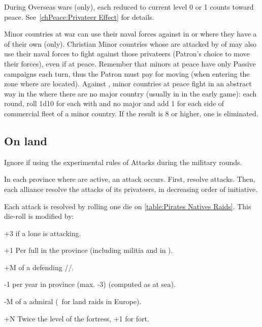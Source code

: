 \bparag During Overseas wars (only), each \TradeFLEET\Faceplus reduced to
current level 0 or 1 counts toward peace.
\bparag See~\ref{chPeace:Privateer Effect} for details.

\begin{todo}
\bparag Minor countries at war can use their naval forces against \corsaire in
\STZ or \CTZ where they have a \TradeFLEET of their own (only).
\bparag Christian Minor countries whose \TradeFLEET are attacked by \corsaire
of \Barbaresques may also use their naval forces to fight against those
privateers (Patron's choice to move their forces), even if at peace.
\bparag Remember that minors at peace have only Passive campaigns each turn,
thus the Patron must pay for moving (when entering the zone where \corsaire
are located).
\bparag Against , minor countries at peace fight in an abstract
way in the \STZ where there are no major country \TradeFLEET (usually in
 in the early game): each round, roll 1d10 for each \STZ with
 \corsaire and no major \TradeFLEET and add 1 for each side of
commercial fleet of a minor country.  If the result is 8 or higher, one
\corsaire\facemoins is eliminated.
\end{todo}

\subsection{On land}
\begin{designnote}
  Ignore if using the experimental rules of Attacks during the military
  rounds.
\end{designnote}

 In each province where
\corsaire are active, an attack occurs.
\bparag First, resolve  \corsaire attacks.
\bparag Then, each alliance resolve the attacks of its privateers, in
decreasing order of initiative.

\bparag Each attack is resolved by rolling one die on \ref{table:Pirates
  Natives Raids}. This die-roll is modified by:
\begin{modlist}
\item[+3] if a lone \corsaire\facemoins is attacking.
\item[+1] Per full \LD in the province (including militia and \LD in \ARMY).
\item[+M] \Man of a defending \LeaderG/\LeaderC/\LeaderGov.
\item[-1] per year in province (max. -3) (computed as at
  sea). %
\item[-M] \Man of a \corsaire admiral (\textonehalf\ for land raids in
  Europe).
\item[+N] Twice the level of the fortress, +1 for fort.
\end{modlist}

